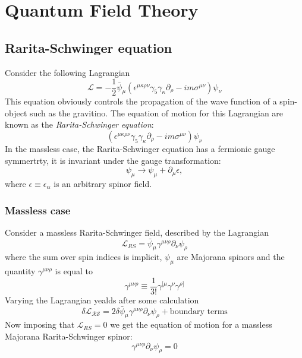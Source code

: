 \chapter{Quantum Field Theory}
\adjustmtc
\minitoc

\section{Rarita-Schwinger equation}
Consider the following Lagrangian
\begin{equation}
  \mathcal{L} = -\frac{1}{2}\bar{\psi}_\mu\left(\epsilon^{\mu\kappa\rho\nu}\gamma_5\gamma_\kappa\partial_\rho-im\sigma^{\mu\nu}\right)\psi_\nu
\end{equation}
This equation obviously controls the propagation of the wave function of
a spin- object such as the gravitino. The equation of motion for
this Lagrangian are known as the \textit{Rarita-Schwinger equation}:
\begin{equation}
\left(\epsilon^{\mu\kappa\rho\nu}\gamma_5\gamma_\kappa\partial_\rho
  -im\sigma^{\mu\nu}\right)\psi_\nu
\end{equation}
In the massless case, the Rarita-Schwinger equation has a fermionic gauge
symmertrty, it is invariant under the gauge transformation:
\begin{equation}
  \psi_\mu\rightarrow\psi_\mu + \partial_\mu\epsilon,
\end{equation}
where $\epsilon\equiv\epsilon_\alpha$ is an arbitrary spinor field. 
\subsection{Massless case}
Consider a massless Rarita-Schwinger field, described by the Lagrangian
\begin{equation}
  \mathcal{L}_{RS} = \bar{\psi}_\mu\gamma^{\mu\nu\rho}\partial_\nu\psi_{\rho}
\end{equation}
where the sum over spin indices is implicit, $\psi_\mu$ are Majorana spinors
and the quantity $\gamma^{\mu\nu\rho}$ is equal to
\begin{equation}
  \gamma^{\mu\nu\rho}\equiv\frac{1}{3!}\gamma^{[\mu}\gamma^\nu\gamma^{\rho]}
\end{equation}
Varying the Lagrangian yealds after some calculation
\begin{equation}
  \delta\mathcal{L_{RS}}
  = 2\delta\bar{\psi}_\mu\gamma^{\mu\nu\rho}\partial_\nu\psi_\rho
  + \text{boundary terms}
\end{equation}
Now imposing that $\mathcal{L}_{RS} =0$ we get the equation of motion for
a massless Majorana Rarita-Schwinger spinor:
\begin{equation}
  \gamma^{\mu\nu\rho}\partial_\nu\psi_\rho = 0
\end{equation}
